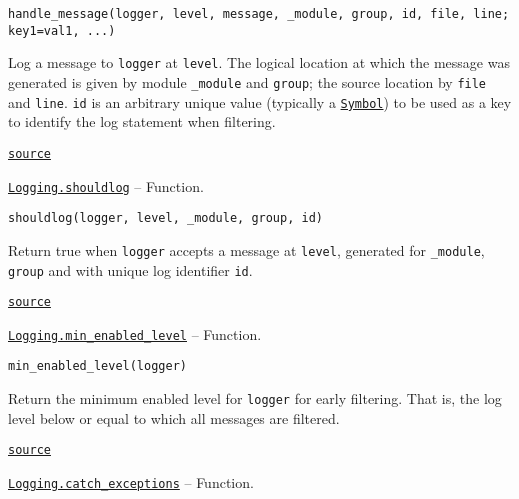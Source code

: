 \begin{adjustwidth}{2em}{0pt}


\begin{verbatim}
handle_message(logger, level, message, _module, group, id, file, line; key1=val1, ...)
\end{verbatim}

Log a message to \texttt{logger} at \texttt{level}.  The logical location at which the message was generated is given by module \texttt{\_module} and \texttt{group}; the source location by \texttt{file} and \texttt{line}. \texttt{id} is an arbitrary unique value (typically a \hyperlink{18332791376992528422}{\texttt{Symbol}}) to be used as a key to identify the log statement when filtering.



\href{https://github.com/JuliaLang/julia/blob/9058264a69f9efc1af805c4473c946f87859b731/base/logging.jl#L31-L39}{\texttt{source}}


\end{adjustwidth}
\hypertarget{10642364941499317938}{}
\hyperlink{10642364941499317938}{\texttt{Logging.shouldlog}}  -- {Function.}

\begin{adjustwidth}{2em}{0pt}


\begin{verbatim}
shouldlog(logger, level, _module, group, id)
\end{verbatim}

Return true when \texttt{logger} accepts a message at \texttt{level}, generated for \texttt{\_module}, \texttt{group} and with unique log identifier \texttt{id}.



\href{https://github.com/JuliaLang/julia/blob/9058264a69f9efc1af805c4473c946f87859b731/base/logging.jl#L42-L47}{\texttt{source}}


\end{adjustwidth}
\hypertarget{1177702033979282781}{}
\hyperlink{1177702033979282781}{\texttt{Logging.min\_enabled\_level}}  -- {Function.}

\begin{adjustwidth}{2em}{0pt}


\begin{verbatim}
min_enabled_level(logger)
\end{verbatim}

Return the minimum enabled level for \texttt{logger} for early filtering.  That is, the log level below or equal to which all messages are filtered.



\href{https://github.com/JuliaLang/julia/blob/9058264a69f9efc1af805c4473c946f87859b731/base/logging.jl#L50-L55}{\texttt{source}}


\end{adjustwidth}
\hypertarget{13546483368377724892}{}
\hyperlink{13546483368377724892}{\texttt{Logging.catch\_exceptions}}  -- {Function.}

